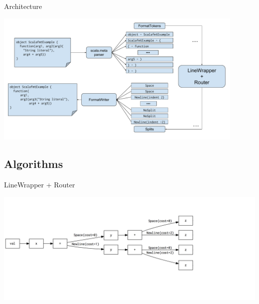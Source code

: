 \documentclass[xcolor=dvipsnames]{beamer}
\theoremstyle{definition}
\begin{document}
\begin{frame}{Architecture}
  \begin{center}
    \includegraphics[width=0.9\textwidth]{img/architechture.pdf}
  \end{center}
\end{frame}


%
%   
%
%   
%
\subsection{Algorithms} %

\begin{frame}{LineWrapper + Router}
  \begin{center}
    \includegraphics[width=\textwidth]{img/router1.png}
  \end{center}
\end{frame}
\end{document}
